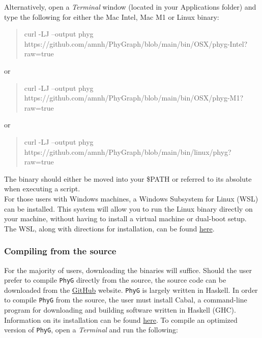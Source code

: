 \documentclass[11pt]{book}
\newcommand{\phyg}{\texttt{PhyG} }
\begin{document}
{{		Alternatively, open a \textit{Terminal} window (located in your Applications folder) and type 
		the following for either the Mac Intel, Mac M1 or Linux binary:
		
		\begin {quote}
		curl -LJ --output phyg https://github.com/amnh/PhyGraph/blob/main/bin/OSX/phyg-Intel?raw=true
		\end{quote}		
		
		\noindent or 
		
		\begin {quote}
		curl -LJ --output phyg https://github.com/amnh/PhyGraph/blob/main/bin/OSX/phyg-M1?raw=true
		\end{quote}	
		
		\noindent or 
		
		\begin {quote}
		curl -LJ --output phyg https://github.com/amnh/PhyGraph/blob/main/bin/linux/phyg?
		raw=true
		\end{quote}
		
		\noindent The binary should either be moved into your \$PATH or referred to its 
		absolute when executing a script.\\
		
		For those users with Windows machines, a Windows Subsystem for Linux 
		(WSL) can be installed. This system will allow you to run the Linux binary directly 
		on your machine, without having to install a virtual machine or dual-boot setup. 
		The WSL, along with directions for installation, can be found 
		\href{https://learn.microsoft.com/en-us/windows/wsl/}{here}.
	
	\subsubsection{Compiling from the source}
		For the majority of users, downloading the binaries will suffice. Should the user prefer to 
		compile \phyg directly from the source, the source code can be downloaded 
		from the \href{https://github.com/amnh/PhyGraph}{GitHub} website. \phyg is largely 
		written in Haskell. In order to compile \phyg from the source, the user must install Cabal, 
		a command-line program for downloading and building software written in Haskell (GHC).  
		Information on its installation can be found  
		\href{https://www.schoolofhaskell.com/user/simonmichael/how-to-cabal-install}{here}.
		To compile an optimized version of \texttt{PhyG}, open a \textit{Terminal} and run the 
		following:
		
}}
\end{document}
